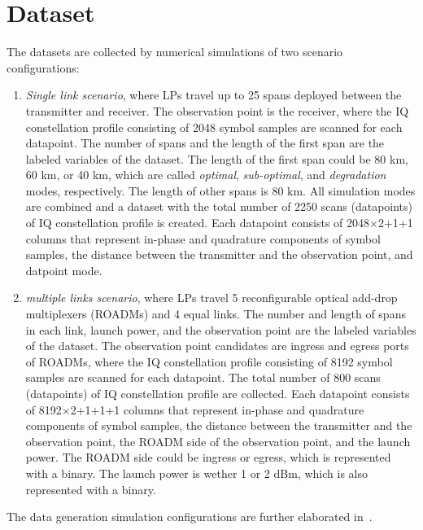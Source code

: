 \documentclass[lettersize,journal, one-column]{IEEEtran}
\begin{document}
\section{Dataset}
\label{section:dataset}
The datasets are collected by numerical simulations of two scenario configurations:
\begin{enumerate}
    \item \textit{Single link scenario}, where LPs travel up to 25 spans deployed between the transmitter and receiver.
    The observation point is the receiver, where the IQ constellation profile consisting of 2048 symbol samples are scanned for each datapoint.
    The number of spans and the length of the first span are the labeled variables of the dataset.
    The length of the first span could be 80 km, 60 km, or 40 km, which are called \textit{optimal}, \textit{sub-optimal}, and \textit{degradation} modes, respectively.
    The length of other spans is 80 km.
    All simulation modes are combined and a dataset with the total number of 2250 scans (datapoints) of IQ constellation profile is created. 
    Each datapoint consists of 2048$\times$2+1+1 columns that represent in-phase and quadrature components of symbol samples, the distance between the transmitter and the observation point, and datpoint mode.
    \item \textit{multiple links scenario}, where LPs travel 5 reconfigurable optical add-drop multiplexers (ROADMs) and 4 equal links.
    The number and length of spans in each link, launch power, and the observation point are the labeled variables of the dataset.
    The observation point candidates are ingress and egress ports of ROADMs, where the IQ constellation profile consisting of 8192 symbol samples are scanned for each datapoint.
    The total number of 800 scans (datapoints) of IQ constellation profile are collected.
    Each datapoint consists of 8192$\times$2+1+1+1 columns that represent in-phase and quadrature components of symbol samples, the distance between the transmitter and the observation point, the ROADM side of the observation point, and the launch power.
    The ROADM side could be ingress or egress, which is represented with a binary.
    The launch power is wether 1 or 2 dBm, which is also represented with a binary.
\end{enumerate}
The data generation simulation configurations are further elaborated in~\cite{data146_2022}.
\end{document}
